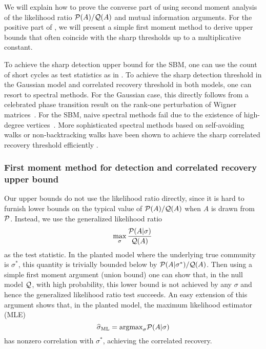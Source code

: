 We will explain how to prove the converse part of   using  second moment analysis of 
the likelihood ratio $\P(A)/\Q(A)$ and mutual information arguments. 
For the positive part of , we will present a simple first moment 
method to derive upper bounds that often coincide with the sharp thresholds up to a multiplicative constant. 

To achieve the sharp detection upper bound for the SBM, one can use the count of 
short cycles as test statistics as in \cite{Mossel13}. To achieve the sharp detection threshold 
in the Gaussian model and correlated recovery threshold in both models, one can resort to spectral methods.
For the Gaussian case, this directly follows from a celebrated phase transition result on the rank-one perturbation of Wigner matrices~\cite{baik2005phase,peche2006largest,benaych2011eigenvalues}. For the SBM, naive spectral methods fail due to the existence of high-degree vertices~\cite{KrzakalaMMSLC13spectral}. 
More sophisticated spectral methods based on self-avoiding walks or
non-backtracking walks have been shown to achieve the sharp correlated recovery threshold efficiently \cite{Massoulie13,Mossel13,BordenaveLelargeMassoulie:2015dq}.





\subsubsection{First moment method for detection and correlated recovery upper bound}
Our upper bounds do not use the likelihood ratio directly, since it is hard to furnish lower bounds on the typical value of $\P(A)/\Q(A)$ when $A$ is drawn from $\P$.
  Instead, we use the generalized likelihood ratio
\[
	\max_\sigma \frac{\P(A | \sigma)}{\Q(A)} \, 
\]
as the test statistic.
In the planted model where the underlying true community is $\sigma^*$, this quantity is trivially bounded below by $\P(A | \sigma^* )/\Q(A)$.  Then using a simple first moment argument (union bound) one can show that, in the null model $\Q$, with high probability, this lower bound is not achieved by any $\sigma$ and hence the generalized likelihood ratio test succeeds.  
An easy extension of this argument shows that, in the planted model, the maximum likelihood estimator (MLE)
$$
\widehat{\sigma}_{\rm ML} = \argmax_\sigma \P(A | \sigma)
$$ 
has nonzero correlation with $\sigma^*$, achieving the correlated recovery.  

